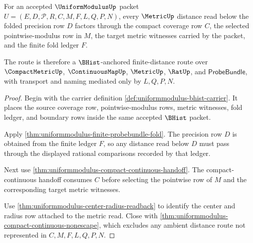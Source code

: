 \begin{theorem}
\label{thm:uniformmodulus-metric-distance-route-soundness}
For an accepted $\UniformModulusUp$ packet $U=(E,D,\mathcal{P},R,C,M,F,L,Q,P,N)$, every $\MetricUp$ distance read below the folded precision row $D$ factors through the compact coverage row $C$, the selected pointwise-modulus row in $M$, the target metric witnesses carried by the packet, and the finite fold ledger $F$.

The route is therefore a $\BHist$-anchored finite-distance route over $\CompactMetricUp$, $\ContinuousMapUp$, $\MetricUp$, $\RatUp$, and $\mathsf{ProbeBundle}$, with transport and naming mediated only by $L,Q,P,N$.
\end{theorem}
\begin{proof}
Begin with the carrier definition \autoref{def:uniformmodulus-bhist-carrier}. It places the source coverage row, pointwise-modulus rows, metric witnesses, fold ledger, and boundary rows inside the same accepted $\BHist$ packet.

Apply \autoref{thm:uniformmodulus-finite-probebundle-fold}. The precision row $D$ is obtained from the finite ledger $F$, so any distance read below $D$ must pass through the displayed rational comparisons recorded by that ledger.

Next use \autoref{thm:uniformmodulus-compact-continuous-handoff}. The compact-continuous handoff consumes $C$ before selecting the pointwise row of $M$ and the corresponding target metric witnesses.

Use \autoref{thm:uniformmodulus-center-radius-readback} to identify the center and radius row attached to the metric read. Close with \autoref{thm:uniformmodulus-compact-continuous-nonescape}, which excludes any ambient distance route not represented in $C,M,F,L,Q,P,N$.
\end{proof}

